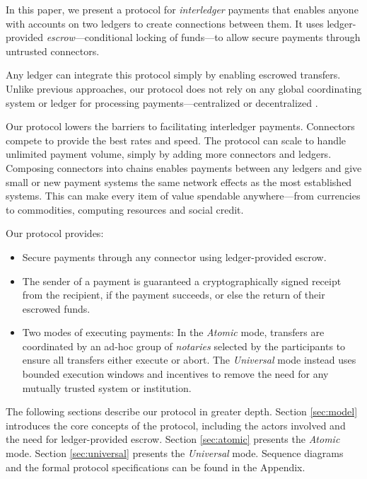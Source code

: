 \documentclass[letterpaper,twocolumn,10pt]{article}
\begin{document}
In this paper, we present a protocol for \mbox{\textit{interledger}} payments that enables anyone with accounts on two ledgers to create connections between them. It uses ledger-provided \textit{escrow}---conditional locking of funds---to allow secure payments through untrusted connectors.

Any ledger can integrate this protocol simply by enabling escrowed transfers.
Unlike previous approaches, our protocol does not rely on any global coordinating system or ledger for processing payments---centralized \cite{davies1989security} or decentralized \cite{mazieresstellar,Bitcoin,schwartz2014ripple}.

Our protocol lowers the barriers to facilitating interledger payments. Connectors compete to provide the best rates and speed. The protocol can scale to handle unlimited payment volume, simply by adding more connectors and ledgers. Composing connectors into chains enables payments between any ledgers and give small or new payment systems the same network effects as the most established systems. This can make every item of value spendable anywhere---from currencies to commodities, computing resources and social credit.

Our protocol provides:
\begin{itemize}
\item Secure payments through any connector using ledger-provided escrow.
\item The sender of a payment is guaranteed a cryptographically signed receipt from the recipient, if the payment succeeds, or else the return of their escrowed funds.
\item Two modes of executing payments: In the \textit{Atomic} mode, transfers are coordinated by an ad-hoc group of \textit{notaries} selected by the participants to ensure all transfers either execute or abort. The \textit{Universal} mode instead uses bounded execution windows and incentives to remove the need for any mutually trusted system or institution.
\end{itemize}

\newpage

The following sections describe our protocol in greater depth. Section \ref{sec:model} introduces the core concepts of the protocol, including the actors involved and the need for ledger-provided escrow. Section \ref{sec:atomic} presents the \textit{Atomic} mode. Section \ref{sec:universal} presents the \textit{Universal} mode. Sequence diagrams and the formal protocol specifications can be found in the Appendix.
\end{document}

